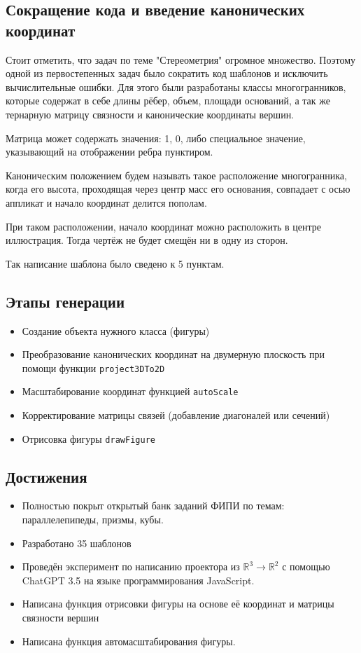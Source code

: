 \documentclass[a4paper, 12pt]{extarticle}
\begin{document}
\subsection*{Сокращение кода и введение канонических координат}

Стоит отметить, что задач по теме "Стереометрия" огромное множество. Поэтому одной из первостепенных задач было сократить код шаблонов и исключить вычислительные ошибки. Для этого были разработаны классы многогранников, которые содержат в себе длины рёбер, объем, площади оснований, а так же тернарную матрицу связности и канонические координаты вершин.

Матрица может содержать значения: 1, 0, либо специальное значение, указывающий на отображении ребра пунктиром.

Каноническим положением будем называть такое расположение многогранника, когда его высота, проходящая через центр масс его основания, совпадает с осью аппликат и начало координат делится пополам.

При таком расположении, начало координат можно расположить в центре иллюстрация. Тогда чертёж не будет смещён ни в одну из сторон.

Так написание шаблона было сведено к 5 пунктам.

\subsection*{Этапы генерации}
\begin{itemize}
	\item Создание объекта нужного класса (фигуры)
	\item Преобразование канонических координат на двумерную плоскость при помощи функции \texttt{project3DTo2D}
	\item Масштабирование координат функцией \texttt{autoScale}
	\item Корректирование матрицы связей (добавление диагоналей или сечений)
	\item Отрисовка фигуры \texttt{drawFigure}
\end{itemize}

\subsection*{Достижения}
\begin{itemize}
	\item Полностью покрыт открытый банк заданий ФИПИ по темам: параллелепипеды, призмы, кубы.
	\item Разработано 35 шаблонов
	\item Проведён эксперимент по написанию проектора из $\mathbb{R}^3 \to \mathbb{R}^2$ с помощью ChatGPT 3.5 на языке программирования JavaScript.
	\item Написана функция отрисовки фигуры на основе её координат и матрицы связности вершин
	\item Написана функция автомасштабирования фигуры.
\end{itemize}
\end{document}
